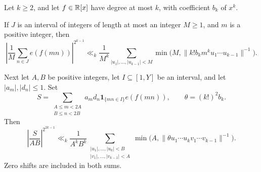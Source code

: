 \begin{lemma}
\label{lem:prime-differencing}
Let $k\ge2$, and let $f\in\mathbb R[x]$ have degree at most $k$, with
coefficient $b_k$ of $x^k$.

If $J$ is an interval of integers of length at most an integer $M\ge1$,
and $m$ is a positive integer, then
\begin{equation}\label{eq:type-one-differencing}
 \left|\frac1M\sum_{n\in J}e(f(mn))\right|^{2^{k-1}}
 \ll_k\frac1{M^k}
 \sum_{|u_1|,\ldots,|u_{k-1}|<M}
 \min\bigl(M,\|k!b_km^ku_1\cdots u_{k-1}\|^{-1}\bigr).
\end{equation}

Next let $A,B$ be positive integers, let $I\subseteq[1,Y]$ be an
interval, and let $|a_m|,|d_n|\le1$.  Set
\[
 S=\sum_{\substack{A\le m<2A\\B\le n<2B}}
       a_md_n\mathbf 1_{\{mn\in I\}}e(f(mn)),\qquad
 \theta=(k!)^2b_k.
\]
Then
\begin{equation}\label{eq:type-two-differencing}
 \left|\frac{S}{AB}\right|^{2^{2k-1}}
 \ll_k\frac1{A^kB^k}
 \sum_{\substack{|u_1|,\ldots,|u_k|<B\\
                  |v_1|,\ldots,|v_{k-1}|<A}}
 \min\bigl(A,\|\theta u_1\cdots u_kv_1\cdots v_{k-1}\|^{-1}\bigr).
\end{equation}
Zero shifts are included in both sums.
\end{lemma}

